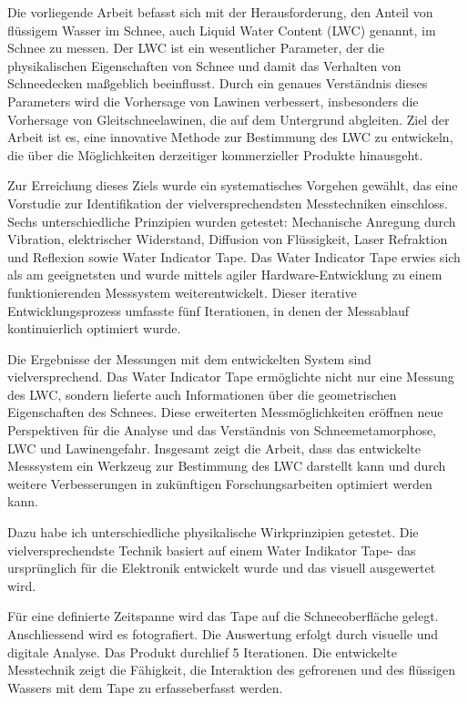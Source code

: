 Die vorliegende Arbeit befasst sich mit der Herausforderung, den Anteil von flüssigem Wasser im Schnee, auch Liquid Water Content (LWC) genannt, im Schnee zu messen. Der LWC ist ein wesentlicher Parameter, der die physikalischen Eigenschaften von Schnee und damit das Verhalten von Schneedecken maßgeblich beeinflusst. Durch ein genaues Verständnis dieses Parameters wird die Vorhersage von Lawinen verbessert, insbesonders die Vorhersage von Gleitschneelawinen, die auf dem Untergrund abgleiten. Ziel der Arbeit ist es, eine innovative Methode zur Bestimmung des LWC zu entwickeln, die über die Möglichkeiten derzeitiger kommerzieller Produkte hinausgeht.

Zur Erreichung dieses Ziels wurde ein systematisches Vorgehen gewählt, das eine Vorstudie zur Identifikation der vielversprechendsten Messtechniken einschloss. Sechs unterschiedliche Prinzipien wurden getestet: Mechanische Anregung durch Vibration, elektrischer Widerstand, Diffusion von Flüssigkeit, Laser Refraktion und Reflexion sowie Water Indicator Tape. Das Water Indicator Tape erwies sich als am geeignetsten und wurde mittels agiler Hardware-Entwicklung zu einem funktionierenden Messsystem weiterentwickelt. Dieser iterative Entwicklungsprozess umfasste fünf Iterationen, in denen der Messablauf kontinuierlich optimiert wurde.

Die Ergebnisse der Messungen mit dem entwickelten System sind vielversprechend. Das Water Indicator Tape ermöglichte nicht nur eine Messung des LWC, sondern lieferte auch Informationen über die geometrischen Eigenschaften des Schnees. Diese erweiterten Messmöglichkeiten eröffnen neue Perspektiven für die Analyse und das Verständnis von Schneemetamorphose, LWC und Lawinengefahr. Insgesamt zeigt die Arbeit, dass das entwickelte Messsystem ein Werkzeug zur Bestimmung des LWC darstellt kann und durch weitere Verbesserungen in zukünftigen Forschungsarbeiten optimiert werden kann.

\iffalse

Dazu habe ich unterschiedliche  physikalische Wirkprinzipien getestet. 
Die vielversprechendste Technik basiert auf einem Water Indikator Tape- das ursprünglich für die Elektronik entwickelt wurde und  das visuell ausgewertet wird.

 Für eine definierte Zeitspanne wird das Tape auf die Schneeoberfläche gelegt. Anschliessend wird es fotografiert. Die Auswertung erfolgt durch visuelle und digitale Analyse.
Das Produkt durchlief 5 Iterationen. Die entwickelte Messtechnik zeigt die Fähigkeit, die Interaktion des gefrorenen und des flüssigen Wassers mit dem Tape zu erfasseberfasst werden.

